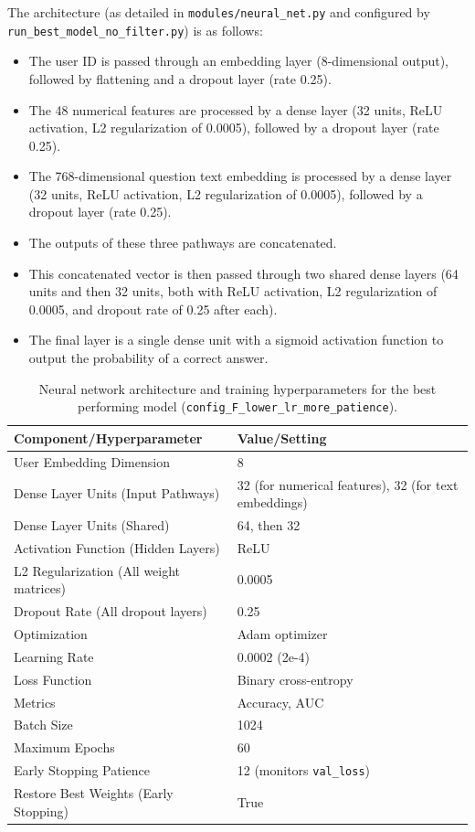 \documentclass[
    a4paper, %
    10pt, %
    twoside, %
]{LTJournalArticle}
\begin{document}
The architecture (as detailed in \texttt{modules/neural\_net.py} and configured by \texttt{run\_best\_model\_no\_filter.py}) is as follows:
\begin{itemize}
    \item The user ID is passed through an embedding layer (8-dimensional output), followed by flattening and a dropout layer (rate 0.25).
    \item The 48 numerical features are processed by a dense layer (32 units, ReLU activation, L2 regularization of 0.0005), followed by a dropout layer (rate 0.25).
    \item The 768-dimensional question text embedding is processed by a dense layer (32 units, ReLU activation, L2 regularization of 0.0005), followed by a dropout layer (rate 0.25).
    \item The outputs of these three pathways are concatenated.
    \item This concatenated vector is then passed through two shared dense layers (64 units and then 32 units, both with ReLU activation, L2 regularization of 0.0005, and dropout rate of 0.25 after each).
    \item The final layer is a single dense unit with a sigmoid activation function to output the probability of a correct answer.
\end{itemize}

\begin{table}[H]
    \centering
    \begin{tabular}{ll}
        \hline
        \textbf{Component/Hyperparameter} & \textbf{Value/Setting} \\
        \hline
        User Embedding Dimension & 8 \\
        Dense Layer Units (Input Pathways) & 32 (for numerical features), 32 (for text embeddings) \\
        Dense Layer Units (Shared) & 64, then 32 \\
        Activation Function (Hidden Layers) & ReLU \\
        L2 Regularization (All weight matrices) & 0.0005 \\
        Dropout Rate (All dropout layers) & 0.25 \\
        Optimization & Adam optimizer \\
        Learning Rate & 0.0002 (2e-4) \\
        Loss Function & Binary cross-entropy  \\
        Metrics & Accuracy, AUC \\
        Batch Size & 1024 \\
        Maximum Epochs & 60 \\
        Early Stopping Patience & 12 (monitors \texttt{val\_loss}) \\
        Restore Best Weights (Early Stopping) & True \\
        \hline
    \end{tabular}
    \caption{Neural network architecture and training hyperparameters for the best performing model (\texttt{config\_F\_lower\_lr\_more\_patience}).}
    \label{tab:model-details}
\end{table}
\end{document}
